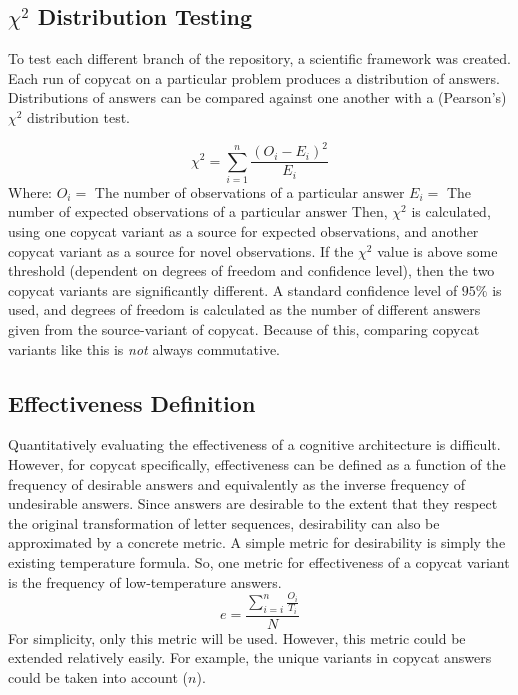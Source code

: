 \documentclass[a4paper]{article}
\begin{document}
    \subsection{$\chi^2$ Distribution Testing}

        To test each different branch of the repository, a scientific framework was created.
        Each run of copycat on a particular problem produces a distribution of answers.
        Distributions of answers can be compared against one another with a (Pearson's) $\chi^2$ distribution test.

        $$\chi^2 = \sum_{i=1}^{n} \frac{(O_i - E_i)^2}{E_i}$$
        Where:
        \newline\indent
        $O_i = $ The number of observations of a particular answer
        \newline\indent
        $E_i = $ The number of expected observations of a particular answer
        \newline
        \newline\indent
        Then, $\chi^2$ is calculated, using one copycat variant as a source for expected observations, and another copycat variant as a source for novel observations.
        If the $\chi^2$ value is above some threshold (dependent on degrees of freedom and confidence level), then the two copycat variants are significantly different.
        A standard confidence level of $95\%$ is used, and degrees of freedom is calculated as the number of different answers given from the source-variant of copycat.
        Because of this, comparing copycat variants like this is \emph{not} always commutative.

    \subsection{Effectiveness Definition}

        Quantitatively evaluating the effectiveness of a cognitive architecture is difficult.
        However, for copycat specifically, effectiveness can be defined as a function of the frequency of desirable answers and equivalently as the inverse frequency of undesirable answers.
        Since answers are desirable to the extent that they respect the original transformation of letter sequences, desirability can also be approximated by a concrete metric.
        A simple metric for desirability is simply the existing temperature formula.
        So, one metric for effectiveness of a copycat variant is the frequency of low-temperature answers.
        $$e = \frac{\sum_{i=i}^{n} \frac{O_i}{T_i}}{N} $$
        For simplicity, only this metric will be used.
        However, this metric could be extended relatively easily.
        For example, the unique variants in copycat answers could be taken into account ($n$).
       
\end{document}
